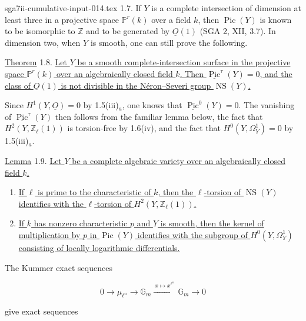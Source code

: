 \begin{filecontents*}{sga7ii-cumulative-input-014.tex}
1.7. If $Y$ is a complete intersection of dimension at least three in a
projective space $\mathbb P^r(k)$ over a field $k$, then
$\operatorname{Pic}(Y)$ is known to be isomorphic to $\mathbb Z$ and to be
generated by $\underline O(1)$ (SGA 2, XII, 3.7).  In dimension two, when
$Y$ is smooth, one can still prove the following.

\underline{Theorem} 1.8. \underline{Let $Y$ be a smooth complete-intersection
surface in the projective space $\mathbb P^r(k)$ over an algebraically
closed field $k$.  Then $\underline{\operatorname{Pic}}^\tau(Y)=0$, and the
class of $\underline O(1)$ is not divisible in the Néron--Severi group
$\operatorname{NS}(Y)$.}

Since $H^1(Y,\underline O)=0$ by 1.5(iii)$_a$, one knows that
$\underline{\operatorname{Pic}}^0(Y)=0$.  The vanishing of
$\underline{\operatorname{Pic}}^\tau(Y)$ then follows from the familiar
lemma below, the fact that $H^2(Y,\mathbb Z_\ell(1))$ is torsion-free by
1.6(iv), and the fact that $H^0(Y,\Omega_Y^1)=0$ by 1.5(iii)$_a$.

\underline{Lemma} 1.9. \underline{Let $Y$ be a complete algebraic variety
over an algebraically closed field $k$.}

\begin{enumerate}[label=(\roman*),leftmargin=2.6em]
\item \underline{If $\ell$ is prime to the characteristic of $k$, then the
$\ell$-torsion of $\operatorname{NS}(Y)$ identifies with the $\ell$-torsion
of $H^2(Y,\mathbb Z_\ell(1))$.}


\item \underline{If $k$ has nonzero characteristic $p$ and $Y$ is smooth,
then the kernel of multiplication by $p$ in $\operatorname{Pic}(Y)$
identifies with the subgroup of $H^0(Y,\Omega_Y^1)$ consisting of locally
logarithmic differentials.}
\end{enumerate}

The Kummer exact sequences

\begin{equation*}
0\longrightarrow\mu_{\ell^n}\longrightarrow\mathbb G_m
\xrightarrow{\ x\mapsto x^{\ell^n}\ }\mathbb G_m\longrightarrow0
\end{equation*}

give exact sequences


\end{filecontents*}
